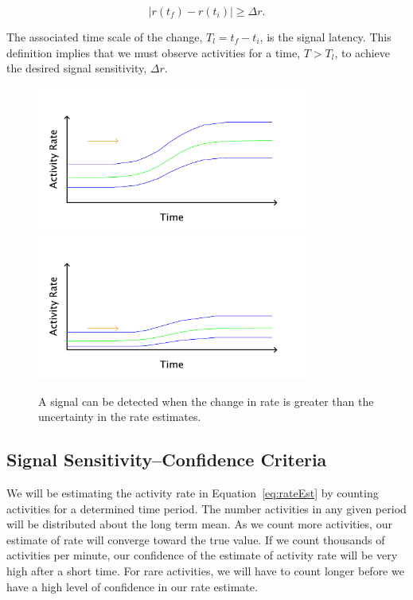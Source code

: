 \documentclass{article}
\begin{document}
\begin{equation}
    \label{eq:signal}
    | r(t_f) - r(t_i) | \geq \Delta r.
\end{equation}

The associated time scale of the change, $T_l = t_f - t_i$, is the signal latency.  This definition implies that we 
must observe activities for a time, $T > T_l$, to achieve the desired signal sensitivity, $\Delta r$.

%
\begin{figure}[h]
    \centering
    \includegraphics[width=3.5in]{./imgs/fig3a.pdf}
    \includegraphics[width=3.5in]{./imgs/fig3b.pdf}
        \caption{A signal can be detected when the change in rate is greater than the uncertainty in the rate estimates.}
    \label{fig:signal}
\end{figure}
%
%

\subsection{Signal Sensitivity--Confidence Criteria} 

We will be estimating the activity rate in Equation~\ref{eq:rateEst} by counting activities for a determined time period.  The
number activities in any given period will be distributed about the long term mean. As we count more activities, our
estimate of rate will converge toward the true value.  If we count thousands of activities per minute, our confidence of the estimate
of activity rate will be very high after a short time.  For rare activities, we will have to count longer before we have
a high level of confidence in our rate estimate.
\end{document}
